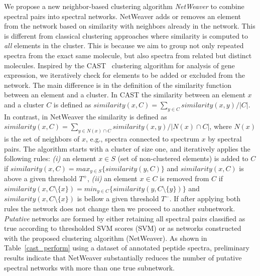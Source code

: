\documentclass[arial,11pt]{article}
\begin{document}
We propose a new neighbor-based clustering algorithm \emph{NetWeaver} to combine spectral pairs into spectral networks. NetWeaver adds or removes an element from the network based on similarity with neighbors already in the network. This is different from classical clustering approaches where similarity is computed to {\em all} elements in the cluster. This is because we aim to group not only repeated spectra from the exact same molecule, but also spectra from related but distinct molecules. Inspired by the CAST~\cite{bendor99} clustering algorithm for analysis of gene expression, we iteratively check for elements to be added or excluded from the network. The main difference is in the definition of the similarity function between an element and a cluster. In CAST the similarity between an element $x$ and a cluster $C$ is defined as $similarity(x,C)=\sum_{y \in C}{similarity(x,y)}/|C|$. In contrast, in NetWeaver the similarity is defined as $similarity(x,C)=\sum_{y \in N(x)\cap
C}{similarity(x,y)}/|N(x)\cap C|$, where $N(x)$ is the set of neighbors of $x$, e.g., spectra connected to spectrum $x$ by spectral pairs. The algorithm starts with a cluster of size one, and iteratively applies the following rules: \emph{(i)} an element $x \in S$ (set of non-clustered elements) is added to $C$ if $similarity(x,C) = max_{y\in S}\{similarity(y,C)\}$ and $similarity(x,C)$ is above a given threshold $T^+$, \emph{(ii)} an element $x \in C$ is removed from $C$ if $similarity(x,C\setminus\{x\}) =
min_{y\in C}\{similarity(y,C\setminus\{y\})\}$ and $similarity(x,C\setminus\{x\})$ is bellow a given threshold $T^-$. If after applying both rules the network does not change then we proceed to another subnetwork.
%
\emph{Putative} networks are formed by either retaining all spectral pairs classified as true according to thresholded SVM scores (SVM) or as networks constructed with the proposed clustering algorithm (NetWeaver).
As shown in Table~\ref{cast_perform} using a dataset of annotated peptide spectra, preliminary results indicate that NetWeaver substantially reduces the number of putative spectral networks with more than one true subnetwork.
\end{document}
